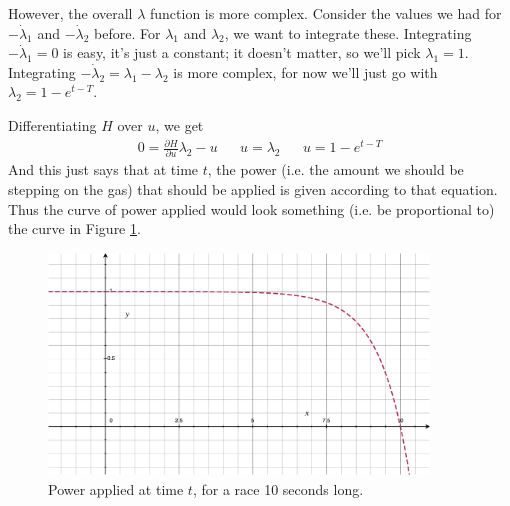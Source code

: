 \documentclass[11pt]{report}
\begin{document}
However, the overall $\lambda$ function is more complex. Consider the values we had for $-\dot\lambda_1$ and $-\dot\lambda_2$ before. For $\lambda_1$ and $\lambda_2$, we want to integrate these. Integrating $-\dot\lambda_1 = 0$ is easy, it's just a constant; it doesn't matter, so we'll pick $\lambda_1 = 1$. Integrating $-\dot\lambda_2 = \lambda_1 - \lambda_2$ is more complex, for now we'll just go with $\lambda_2 = 1 - e^{t - T}$.

Differentiating $H$ over $u$, we get
\begin{align*}
  0 = \frac{\partial H}{\partial u} \lambda_2 - u
  & &
  u = \lambda_2
  & &
  u = 1 - e^{t - T}
\end{align*}
And this just says that at time $t$, the power (i.e. the amount we should be stepping on the gas) that should be applied is given according to that equation. Thus the curve of power applied would look something (i.e. be proportional to) the curve in Figure \ref{fig:power}.

\begin{figure}[H]
  \centering
  \includegraphics[width=0.9\textwidth]{u-power.pdf}
  \caption{Power applied at time $t$, for a race 10 seconds long.}
  \label{fig:power}
\end{figure}
\end{document}
